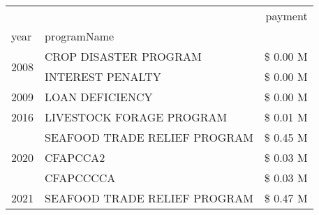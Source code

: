 \begin{tabular}{llr}
\toprule
 &  & payment \\
year & programName &  \\
\midrule
\multirow[t]{2}{*}{2008} & CROP DISASTER PROGRAM & \$ 0.00 M \\
 & INTEREST PENALTY & \$ 0.00 M \\
\cline{1-3}
2009 & LOAN DEFICIENCY & \$ 0.00 M \\
\cline{1-3}
2016 & LIVESTOCK FORAGE PROGRAM & \$ 0.01 M \\
\cline{1-3}
\multirow[t]{3}{*}{2020} & SEAFOOD TRADE RELIEF PROGRAM & \$ 0.45 M \\
 & CFAPCCA2 & \$ 0.03 M \\
 & CFAPCCCCA & \$ 0.03 M \\
\cline{1-3}
2021 & SEAFOOD TRADE RELIEF PROGRAM & \$ 0.47 M \\
\cline{1-3}
\bottomrule
\end{tabular}
